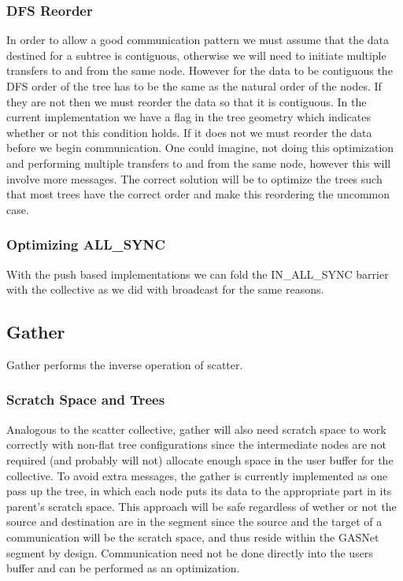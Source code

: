 \documentclass[times,10pt]{article}
\begin{document}
\subsubsection{DFS Reorder}
In order to allow a good communication pattern we must assume that the data destined for a subtree is contiguous, otherwise we will need to initiate multiple transfers to and from the same node. However for the data to be contiguous the DFS order of the tree has to be the same as the natural order of the nodes. If they are not then we must reorder the data so that it is contiguous. In the current implementation we have a flag in the tree geometry which indicates whether or not this condition holds. If it does not we must reorder the data before we begin communication. One could imagine, not doing this optimization and performing multiple transfers to and from the same node, however this will involve more messages. The correct solution will be to optimize the trees such that most trees have the correct order and make this reordering the uncommon case. 

\subsubsection{Optimizing ALL\_SYNC}
With the push based implementations we can fold the IN\_ALL\_SYNC barrier with the collective as we did with broadcast for the same reasons.

\subsection{Gather}
Gather performs the inverse operation of scatter. 

\subsubsection{Scratch Space and Trees}
Analogous to the scatter collective, gather will also need scratch space to work correctly with non-flat tree configurations since the intermediate nodes are not required (and probably will not) allocate enough space in the user buffer for the collective. To avoid extra messages, the gather is currently implemented as one pass up the tree, in which each node puts its data to the appropriate part in its parent's scratch space. This approach will be safe regardless of wether or not the source and destination are in the segment since the source and the target of a communication will be the scratch space, and thus reside within the GASNet segment by design. Communication need not be done directly into the users buffer and can be performed as an optimization. 
\end{document}
